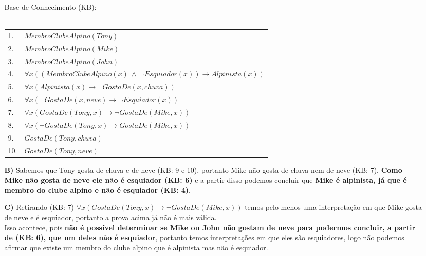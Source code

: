 \documentclass[12pt]{article}
\begin{document}
\begin{itemize}
\begin{itemize}
					\begin{center}
						Base de Conhecimento (KB):\\ \hfill \\
						\begin{tabular}{l|l}
							1. & $MembroClubeAlpino(Tony)$\\
							2. & $MembroClubeAlpino(Mike)$\\
							3. & $MembroClubeAlpino(John)$\\
							4. & $\forall x ((MembroClubeAlpino(x) \ \wedge \ \neg Esquiador(x)) 
							\rightarrow Alpinista(x)) $ \\
							5. & $\forall x (Alpinista(x) \rightarrow \neg GostaDe(x, chuva)) $\\
							6. & $\forall x (\neg GostaDe(x, neve) \rightarrow \neg Esquiador(x))$\\
							7. & $\forall x (GostaDe(Tony, x) \rightarrow \neg GostaDe(Mike, x))$\\
							8. & $\forall x (\neg GostaDe(Tony, x) \rightarrow GostaDe(Mike, x))$\\
							9. & $GostaDe(Tony, chuva)$\\
							10. & $GostaDe(Tony, neve)$\\			
						\end{tabular}
					\end{center}
				\item[\textbf{B) }]
					\hfill\newline
					Sabemos que Tony gosta de chuva e de neve (KB: 9 e 10), portanto
					Mike não gosta de chuva nem de neve (KB: 7). \textbf{Como Mike não gosta
					de neve ele não é esquiador (KB: 6)} e a partir disso podemos
					concluir que \textbf{Mike é alpinista, já que é membro do clube alpino e
					não é esquiador (KB: 4)}.
				\newpage
				\item[\textbf{C) }]
					\hfill\newline	
					Retirando (KB: 7)  $\forall x (GostaDe(Tony, x) \rightarrow \neg GostaDe(Mike, 
					x))$ temos pelo menos uma interpretação em que Mike gosta de neve
					e é esquiador, portanto a prova acima já não é mais válida.\\
					Isso acontece, pois \textbf{não é possível determinar se Mike ou John não gostam 
					de neve para podermos concluir, a partir de (KB: 6), que um deles não é
					esquiador}, portanto temos interpretações em que eles são esquiadores,
					logo não podemos afirmar que existe um membro do clube alpino que é alpinista mas 
					não é esquiador.\\

\end{itemize}
\end{itemize}
\end{document}
